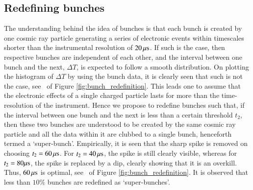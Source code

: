 \subsection{Redefining bunches}
\label{subsec:redefining_bunches}
The understanding behind the idea of bunches is that each bunch is created by one cosmic ray particle generating a series of electronic events within timescales shorter than the instrumental resolution of $20 \, {\rm \mu s}$. If such is the case, then respective bunches are independent of each other, and the interval between one bunch and the next, $\Delta T$, is expected to follow a smooth distribution. On plotting the histogram of $\Delta T$ by using the bunch data, it is clearly seen that such is not the case, see \eL\ of Figure \ref{fig:bunch_redefinition}. This leads one to assume that the electronic effects of a single charged particle lasts for more than the time-resolution of the instrument. Hence we propose to redefine bunches such that, if the interval between one bunch and the next is less than a certain threshold $t_2$, then these two bunches are understood to be created by the same cosmic ray particle and all the data within it are clubbed to a single bunch, henceforth termed a `super-bunch'. Empirically, it is seen that the sharp spike is removed on choosing $t_2 = 60 \, {\rm \mu s}$. For $t_2 = 40 \, {\rm \mu s}$, the spike is still clearly visible, whereas for $t_2 = 80 {\rm \mu s}$, the spike is replaced by a dip, clearly showing that it is an overkill. Thus, $60 \, {\rm \mu s}$ is optimal, see \eR\ of Figure \ref{fig:bunch_redefinition}. It is observed that less than $10 \%$ bunches are redefined as `super-bunches'.

